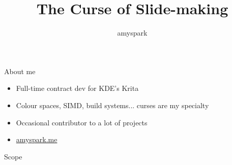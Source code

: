 \documentclass[aspectratio=169]{divoc}
\title{The Curse of Slide-making}
\author{amyspark}
\date{\DTMdate{2022-04-17}}
\begin{document}
\maketitle

\begin{frame}{About me}
  \begin{itemize}[<*>]
    \item Full-time contract dev for KDE's Krita
    \item Colour spaces, SIMD, build systems... curses are my specialty 
    \item Occasional contributor to a lot of projects
    \item \href{https://www.amyspark.me}{amyspark.me}
  \end{itemize}
\end{frame}
\begin{frame}{Scope}
  \tableofcontents
\end{frame}
\end{document}
